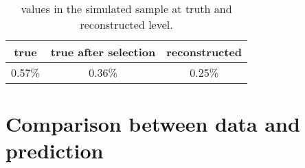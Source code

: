 \begin{table}[!htb]\centering
  \begin{tabular}{ c c c}
    \toprule
    true \ac{} & true \ac{} after selection & reconstructed \ac{}\\
    \midrule
    0.57\% & 0.36\% &  0.25\%  \\
    \bottomrule
  \end{tabular}
  \caption{\ac{} values in the simulated \ttbar{} sample at truth and
    reconstructed level.}
  \label{tab:actruthreco}
\end{table}

\section{Comparison between data and prediction}
\label{sec:datamcreco}

